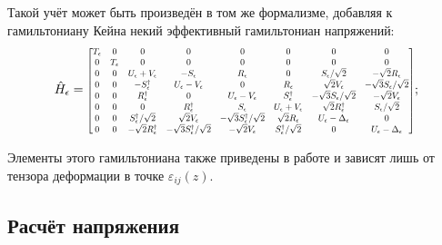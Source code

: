 \documentclass[../main.tex]{subfiles}
\newcommand{\st}{S}
\newcommand{\vep}{\varepsilon}
\begin{document}
    Такой учёт может быть произведён в том же формализме, добавляя к гамильтониану 
    Кейна некий эффективный гамильтониан напряжений:
    \begin{equation}
        \hat{H}_\epsilon =
            \rmatrix[0.7]{
                T_\epsilon       &  0 & 0 & 0 & 0 & 0 & 0 & 0\\
                0    &   T_\epsilon   & 0 & 0 & 0 & 0 & 0 & 0\\
                0    & 0  & U_\epsilon + V_\epsilon         & -\st_\epsilon                             & R_\epsilon                                & 0                              & \st_\epsilon / \sqrt{2}           & -\sqrt{2} R_\epsilon\\
                0    & 0  & -\st^\dagger_\epsilon           & U_\epsilon - V_\epsilon                   & 0                                         & R_\epsilon                     & \sqrt{2} V_\epsilon               & -\sqrt{3} \st_\epsilon /\sqrt{2}\\
                0    & 0  & R^\dagger_\epsilon              & 0                                         & U_\epsilon - V_\epsilon                   & \st^\dagger_\epsilon           & - \sqrt{3} \st_\epsilon /\sqrt{2} & - \sqrt{2} V_\epsilon\\
                0    & 0  & 0                               & R^\dagger_\epsilon                        & \st_\epsilon                              & U_\epsilon+V_\epsilon          & \sqrt{2} R_\epsilon^\dagger       & \st_\epsilon/\sqrt{2}\\
                0    & 0  & \st^\dagger_\epsilon /\sqrt{2}  & \sqrt{2} V_\epsilon                       & - \sqrt{3} \st^\dagger_\epsilon /\sqrt{2} & \sqrt{2} R_\epsilon            & U_\epsilon - \Delta_\epsilon      & 0\\
                0    & 0  & - \sqrt{2} R^\dagger_\epsilon   & -\sqrt{3} \st^\dagger_\epsilon /\sqrt{2}  & -\sqrt{2} V_\epsilon                      & \st^\dagger_\epsilon /\sqrt{2} & 0                                 & U_\epsilon - \Delta_\epsilon
            };
    \end{equation} 

    Элементы этого гамильтониана также приведены в работе \cite{Novik:2005} и зависят 
    лишь от тензора деформации в точке $\vep_{ij}(z)$.

    \subsection{Расчёт напряжения}
\end{document}

